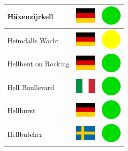 \documentclass[12pt, a4paper, twoside]{report}
\begin{document}
\begin{center}
\begin{longtable}{|p{5cm}|p{2cm}|p{2cm}|}
 Häxenzijrkell                                              & \includegraphics[width=1cm]{../img/flags/de} &   \includegraphics[width=1cm]{../likes/y} \\ \hline
 Heimdalls Wacht                                            & \includegraphics[width=1cm]{../img/flags/de} &   \includegraphics[width=1cm]{../likes/m} \\ \hline
 Hellbent on Rocking                                        & \includegraphics[width=1cm]{../img/flags/de} &   \includegraphics[width=1cm]{../likes/y} \\ \hline
 Hell Boullevard                                            & \includegraphics[width=1cm]{../img/flags/it} &   \includegraphics[width=1cm]{../likes/y} \\ \hline
 Hellburst                                                  & \includegraphics[width=1cm]{../img/flags/de} &   \includegraphics[width=1cm]{../likes/y} \\ \hline
 Hellbutcher                                                & \includegraphics[width=1cm]{../img/flags/se} &   \includegraphics[width=1cm]{../likes/y} \\ \hline

\end{longtable}
\end{center}
\end{document}
